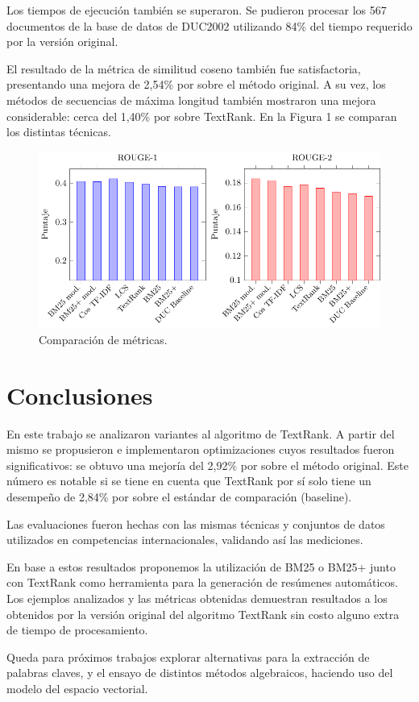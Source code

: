 \documentclass{llncs}
\begin{document}
Los tiempos de ejecución también se superaron. Se pudieron procesar los 567 documentos de la base de datos de DUC2002 utilizando 84\% del tiempo requerido por la versión original.

El resultado de la métrica de similitud coseno también fue satisfactoria, presentando una mejora de 2,54\% por sobre el método original. A su vez, los métodos de secuencias de máxima longitud también mostraron una mejora considerable: cerca del 1,40\% por sobre TextRank. En la Figura 1 se comparan los distintas técnicas.

\begin{figure}[h!]
    \centering
    \includegraphics[width=1\textwidth]{rouge-scores.pdf}
    \caption{Comparación de métricas.}
\end{figure}



\section{Conclusiones}
En este trabajo se analizaron variantes al algoritmo de TextRank. A partir del mismo se propusieron e implementaron optimizaciones cuyos resultados fueron significativos: se obtuvo una mejoría del 2,92\% por sobre el método original. Este número es notable si se tiene en cuenta que TextRank por sí solo tiene un desempeño de  2,84\% por sobre el estándar de comparación (baseline).

Las evaluaciones fueron hechas con las mismas técnicas y conjuntos de datos utilizados en competencias internacionales, validando así las mediciones.

En base a estos resultados proponemos la utilización de BM25 o BM25+ junto con TextRank como herramienta para la generación de resúmenes automáticos. Los ejemplos analizados y las métricas obtenidas demuestran resultados a los obtenidos por la versión original del algoritmo TextRank sin costo alguno extra de tiempo de procesamiento. 

Queda para próximos trabajos explorar alternativas para la extracción de palabras claves, y el ensayo de distintos métodos algebraicos, haciendo uso del modelo del espacio vectorial.


{}

\end{document}
